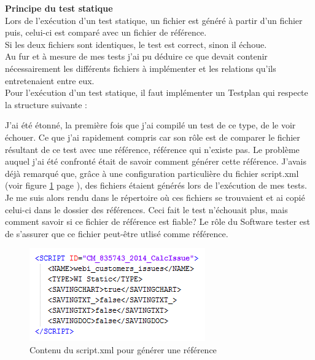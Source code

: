 \textbf{Principe du test statique}\hfill \\ \indent
Lors de l'ex\'{e}cution d'un test statique, un fichier est g\'{e}n\'{e}r\'{e} \`{a} partir d'un fichier puis, celui-ci est compar\'{e} avec un fichier de r\'{e}f\'{e}rence.\\
Si les deux fichiers sont identiques, le test est correct, sinon il \'{e}choue.\\
Au fur et \`{a} mesure de mes tests j'ai pu d\'{e}duire ce que devait contenir n\'{e}cessairement les diff\'{e}rents fichiers \`{a} impl\'{e}menter et les relations qu'ils entretenaient entre eux.\\
Pour l'ex\'{e}cution d'un test statique, il faut impl\'{e}menter un \gls{Testplan} qui respecte la structure suivante :



J'ai \'{e}t\'{e} \'{e}tonn\'{e}, la premi\`{e}re fois que j'ai compilé un test de ce type, de le voir \'{e}chouer. Ce que j'ai rapidement compris car son r\^{o}le est de comparer le fichier r\'{e}sultant de ce test avec une r\'{e}f\'{e}rence, r\'{e}f\'{e}rence qui n'existe pas. Le probl\`{e}me auquel j'ai \'{e}t\'{e} confront\'{e} \'{e}tait de savoir comment g\'{e}n\'{e}rer cette r\'{e}f\'{e}rence. J'avais d\'{e}j\`{a} remarqu\'{e} que, gr\^{a}ce \`{a} une configuration particuli\`{e}re du fichier script.xml (voir figure \ref{figure:scriptXmlSavingRef} page \pageref{figure:scriptXmlSavingRef}), des fichiers \'{e}taient g\'{e}n\'{e}r\'{e}s lors de l'ex\'{e}cution de mes tests. Je me suis alors rendu dans le r\'{e}pertoire o\`{u} ces fichiers se trouvaient et ai copié celui-ci dans le dossier des r\'{e}f\'{e}rences. Ceci fait le test n'\'{e}chouait plus, mais comment savoir si ce fichier de r\'{e}f\'{e}rence est fiable? Le r\^{o}le du \gls{Software tester} est de s'assurer que ce fichier peut-\^{e}tre utlis\'{e} comme r\'{e}f\'{e}rence.\\

\begin{figure}[!ht]
  \centering
      \includegraphics{images/scriptXmlSavingRef.png}
  \caption{Contenu du script.xml pour g\'{e}n\'{e}rer une r\'{e}f\'{e}rence}
	\label{figure:scriptXmlSavingRef}
\end{figure}



